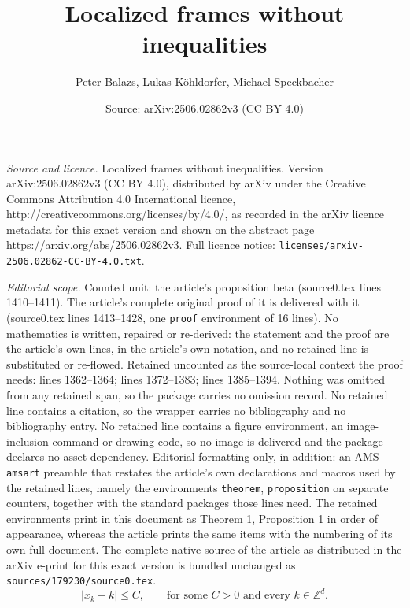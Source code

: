 \documentclass[10pt,a4paper]{amsart}
\title{Localized frames without inequalities}
\author{Peter Balazs, Lukas K\"ohldorfer, Michael Speckbacher}
\date{Source: arXiv:2506.02862v3 (CC BY 4.0)}
\newcommand{\Z}[0]{{\mathbb{Z}}}
\begin{document}
\maketitle

\noindent\emph{Source and licence.} Localized frames without inequalities. Version arXiv:2506.02862v3 (CC BY 4.0), distributed by arXiv under the Creative Commons Attribution 4.0 International licence, http://creativecommons.org/licenses/by/4.0/, as recorded in the arXiv licence metadata for this exact version and shown on the abstract page https://arxiv.org/abs/2506.02862v3. Full licence notice: \texttt{licenses/arxiv-2506.02862-CC-BY-4.0.txt}.\par\smallskip

\noindent\textit{Editorial scope.} Counted unit: the article's proposition beta (source0.tex lines 1410--1411). The article's complete original proof of it is delivered with it (source0.tex lines 1413--1428, one \texttt{proof} environment of 16 lines). No mathematics is written, repaired or re-derived: the statement and the proof are the article's own lines, in the article's own notation, and no retained line is substituted or re-flowed.  Retained uncounted as the source-local context the proof needs: lines 1362--1364; lines 1372--1383; lines 1385--1394.  Nothing was omitted from any retained span, so the package carries no omission record.  No retained line contains a citation, so the wrapper carries no bibliography and no bibliography entry.  No retained line contains a figure environment, an image-inclusion command or drawing code, so no image is delivered and the package declares no asset dependency.  Editorial formatting only, in addition: an AMS \texttt{amsart} preamble that restates the article's own declarations and macros used by the retained lines, namely the environments \texttt{theorem}, \texttt{proposition} on separate counters, together with the standard packages those lines need.  The retained environments print in this document as Theorem 1, Proposition 1 in order of appearance, whereas the article prints the same items with the numbering of its own full document.  The complete native source of the article as distributed in the arXiv e-print for this exact version is bundled unchanged as \texttt{sources/179230/source0.tex}.
\begin{equation}\label{pert}
\vert x_k -k\vert \leq C,\qquad\text{for some }C>0\text{ and every }k\in\Z^d. 
\end{equation}
\end{document}
